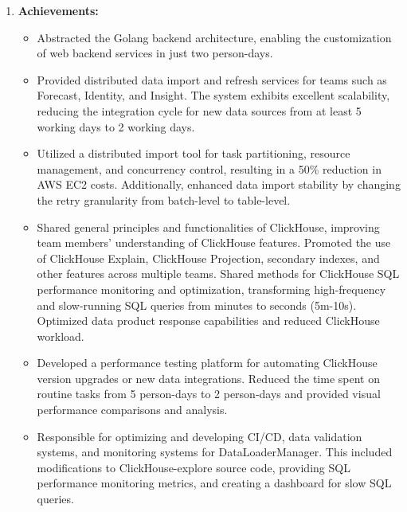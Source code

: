 \documentclass{resume}
\begin{document}
\begin{enumerate}
    \item \textbf{Achievements:}
    \begin{itemize}
      \item Abstracted the Golang backend architecture, enabling the customization of web backend services in just two person-days.
      \item Provided distributed data import and refresh services for teams such as Forecast, Identity, and Insight. The system exhibits excellent scalability, reducing the integration cycle for new data sources from at least 5 working days to 2 working days. 
      \item Utilized a distributed import tool for task partitioning, resource management, and concurrency control, resulting in a 50\% reduction in AWS EC2 costs. Additionally, enhanced data import stability by changing the retry granularity from batch-level to table-level.
      \item Shared general principles and functionalities of ClickHouse, improving team members' understanding of ClickHouse features. Promoted the use of ClickHouse Explain, ClickHouse Projection, secondary indexes, and other features across multiple teams. Shared methods for ClickHouse SQL performance monitoring and optimization, transforming high-frequency and slow-running SQL queries from minutes to seconds (5m-10s). Optimized data product response capabilities and reduced ClickHouse workload.
      \item Developed a performance testing platform for automating ClickHouse version upgrades or new data integrations. Reduced the time spent on routine tasks from 5 person-days to 2 person-days and provided visual performance comparisons and analysis.
      \item Responsible for optimizing and developing CI/CD, data validation systems, and monitoring systems for DataLoaderManager. This included modifications to ClickHouse-explore source code, providing SQL performance monitoring metrics, and creating a dashboard for slow SQL queries.
  \end{itemize}
\end{enumerate}
\end{document}
